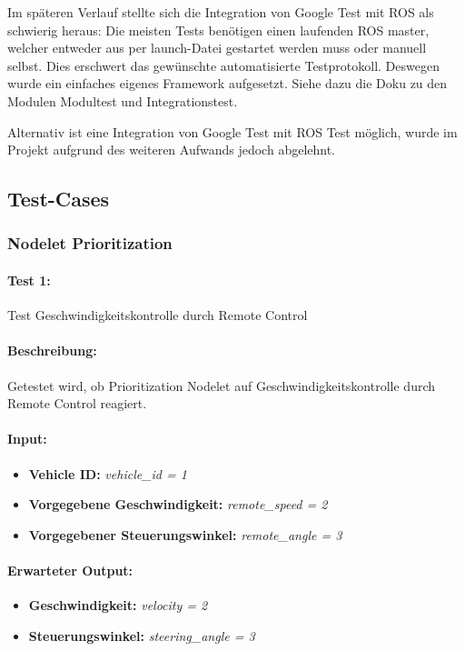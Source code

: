 \documentclass[a4paper, 12pt, titlepage]{scrartcl}
\begin{document}
		Im späteren Verlauf stellte sich die Integration von Google Test mit ROS als schwierig heraus: Die meisten Tests benötigen einen laufenden ROS master, welcher entweder aus per launch-Datei gestartet werden muss oder manuell selbst. Dies erschwert das gewünschte automatisierte Testprotokoll.	Deswegen wurde ein einfaches eigenes Framework aufgesetzt. Siehe dazu die Doku zu den Modulen Modultest und Integrationstest.

		Alternativ ist eine Integration von Google Test mit ROS Test möglich, wurde im Projekt aufgrund des weiteren Aufwands jedoch abgelehnt.


		\subsection{Test-Cases}
		\label{test_cases}
			\subsubsection{Nodelet Prioritization}
			\label{node_prioritization}
				\paragraph{Test 1:}{Test Geschwindigkeitskontrolle durch Remote Control}
				\paragraph{Beschreibung:} Getestet wird, ob Prioritization Nodelet auf Geschwindigkeitskontrolle durch Remote Control reagiert.
				\paragraph{Input:}
				\begin{itemize} \itemsep-0.5em
					\item \textbf{Vehicle ID:} \emph{vehicle\_id = 1}
					\item \textbf{Vorgegebene Geschwindigkeit:} \emph{remote\_speed = 2}
					\item \textbf{Vorgegebener Steuerungswinkel:} \emph{remote\_angle = 3}
				\end{itemize}
				\paragraph{Erwarteter Output:}
				\begin{itemize} \itemsep-0.5em
					\item \textbf{Geschwindigkeit:} \emph{velocity = 2}
					\item \textbf{Steuerungswinkel:} \emph{steering\_angle = 3}
				\end{itemize}
\end{document}
